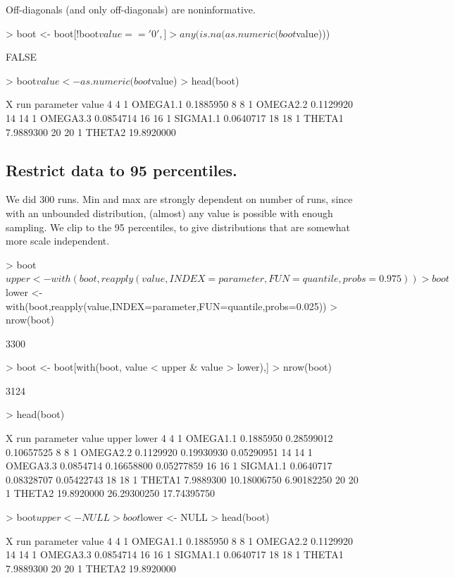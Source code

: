 Off-diagonals (and only off-diagonals) are noninformative.
\begin{Schunk}
\begin{Sinput}
> boot <- boot[!boot$value=='0',]
> any(is.na(as.numeric(boot$value)))
\end{Sinput}
\begin{Soutput}
[1] FALSE
\end{Soutput}
\begin{Sinput}
> boot$value <- as.numeric(boot$value)
> head(boot)
\end{Sinput}
\begin{Soutput}
    X run parameter      value
4   4   1  OMEGA1.1  0.1885950
8   8   1  OMEGA2.2  0.1129920
14 14   1  OMEGA3.3  0.0854714
16 16   1  SIGMA1.1  0.0640717
18 18   1    THETA1  7.9889300
20 20   1    THETA2 19.8920000
\end{Soutput}
\end{Schunk}
\subsection{Restrict data to 95 percentiles.}
We did 300 runs.  Min and max are strongly dependent on number of runs, since 
with an unbounded distribution, (almost) any value is possible with enough sampling.
We clip to the 95 percentiles, to give distributions that are somewhat more
scale independent.
\begin{Schunk}
\begin{Sinput}
> boot$upper <- with(boot,reapply(value,INDEX=parameter,FUN=quantile,probs=0.975))
> boot$lower <- with(boot,reapply(value,INDEX=parameter,FUN=quantile,probs=0.025))
> nrow(boot)
\end{Sinput}
\begin{Soutput}
[1] 3300
\end{Soutput}
\begin{Sinput}
> boot <- boot[with(boot, value < upper & value > lower),]
> nrow(boot)
\end{Sinput}
\begin{Soutput}
[1] 3124
\end{Soutput}
\begin{Sinput}
> head(boot)
\end{Sinput}
\begin{Soutput}
    X run parameter      value       upper       lower
4   4   1  OMEGA1.1  0.1885950  0.28599012  0.10657525
8   8   1  OMEGA2.2  0.1129920  0.19930930  0.05290951
14 14   1  OMEGA3.3  0.0854714  0.16658800  0.05277859
16 16   1  SIGMA1.1  0.0640717  0.08328707  0.05422743
18 18   1    THETA1  7.9889300 10.18006750  6.90182250
20 20   1    THETA2 19.8920000 26.29300250 17.74395750
\end{Soutput}
\begin{Sinput}
> boot$upper <- NULL
> boot$lower <- NULL
> head(boot)
\end{Sinput}
\begin{Soutput}
    X run parameter      value
4   4   1  OMEGA1.1  0.1885950
8   8   1  OMEGA2.2  0.1129920
14 14   1  OMEGA3.3  0.0854714
16 16   1  SIGMA1.1  0.0640717
18 18   1    THETA1  7.9889300
20 20   1    THETA2 19.8920000
\end{Soutput}
\end{Schunk}
